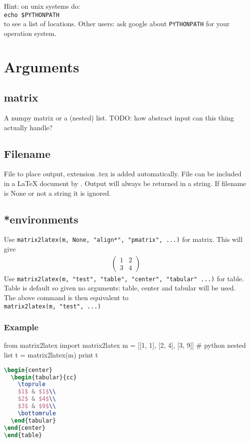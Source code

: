 Hint: on unix systems do: \\
\verb!echo $PYTHONPATH! \\
to see a list of locations. Other users: ask google about \verb!PYTHONPATH!
for your operation system.

\section{Arguments}
  
\subsection{matrix}
  A numpy matrix or a (nested) list. TODO: how abstract input can this thing actually handle?

\subsection{Filename}
  File to place output, extension .tex is added automatically. File can be included in a LaTeX
  document by \verb!!. Output will always be returned in a string. If filename is None
  or not a string it is ignored.
  
\subsection{*environments}
  Use 
\lstinline{matrix2latex(m, None, "align*", "pmatrix", ...)} for matrix.
  This will give
  \begin{align*}
    \begin{pmatrix}
      1 & 2 \\
      3 & 4
    \end{pmatrix}
  \end{align*}
  Use 
\lstinline{matrix2latex(m, "test", "table", "center", "tabular" ...)} for table.
  Table is default so given no arguments: table, center and tabular will be used.
  The above command is then equivalent to \\
\lstinline{matrix2latex(m, "test", ...)}

\subsubsection{Example}
\begin{sageblock}
  from matrix2latex import matrix2latex
  m = [[1, 1], [2, 4], [3, 9]] # python nested list
  t = matrix2latex(m)
  print t
\end{sageblock}
\begin{lstlisting}[language=tex, morekeywords={begin}]
\begin{center}
  \begin{tabular}{cc}
    \toprule
    $1$ & $1$\\
    $2$ & $4$\\
    $3$ & $9$\\
    \bottomrule
  \end{tabular}
\end{center}
\end{table}
\end{lstlisting}

